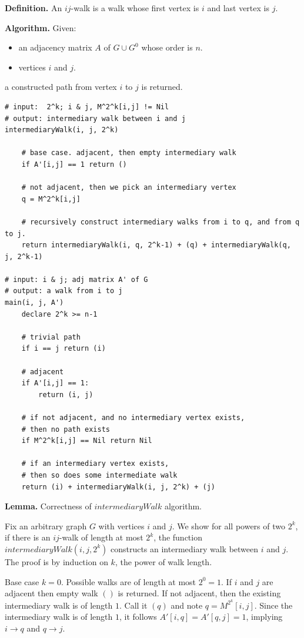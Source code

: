 \textbf{Definition.} An $ij$-walk is a walk whose first vertex is $i$ and last vertex is $j$.

\textbf{Algorithm.} Given:
\begin{itemize}
  \item an adjacency matrix $A$ of $G \cup G^0$ whose order is $n$.
  \item vertices $i$ and $j$.
\end{itemize}
a constructed path from vertex $i$ to $j$ is returned.

\begin{verbatim}
# input:  2^k; i & j, M^2^k[i,j] != Nil
# output: intermediary walk between i and j
intermediaryWalk(i, j, 2^k)

    # base case. adjacent, then empty intermediary walk
    if A'[i,j] == 1 return ()
    
    # not adjacent, then we pick an intermediary vertex
    q = M^2^k[i,j]
    
    # recursively construct intermediary walks from i to q, and from q to j.
    return intermediaryWalk(i, q, 2^k-1) + (q) + intermediaryWalk(q, j, 2^k-1)

# input: i & j; adj matrix A' of G
# output: a walk from i to j
main(i, j, A')
    declare 2^k >= n-1

    # trivial path
    if i == j return (i)

    # adjacent
    if A'[i,j] == 1:
        return (i, j)

    # if not adjacent, and no intermediary vertex exists,
    # then no path exists
    if M^2^k[i,j] == Nil return Nil

    # if an intermediary vertex exists,
    # then so does some intermediate walk
    return (i) + intermediaryWalk(i, j, 2^k) + (j)
\end{verbatim}

\textbf{Lemma.} Correctness of $intermediaryWalk$ algorithm.

Fix an arbitrary graph $G$ with vertices $i$ and $j$. We show for all powers of two $2^k$, if there is an $ij$-walk of length at most $2^k$, the function $intermediaryWalk(i,j,2^k)$ constructs an intermediary walk between $i$ and $j$. The proof is by induction on $k$, the power of walk length.

Base case $k = 0$. Possible walks are of length at most $2^0 = 1$. If $i$ and $j$ are adjacent then empty walk $()$ is returned. If not adjacent, then the existing intermediary walk is of length $1$. Call it $(q)$ and note $q = M^{2^k}[i,j]$. Since the intermediary walk is of length $1$, it follows $A'[i,q] = A'[q,j] = 1$, implying $i \rightarrow q$ and $q \rightarrow j$.

